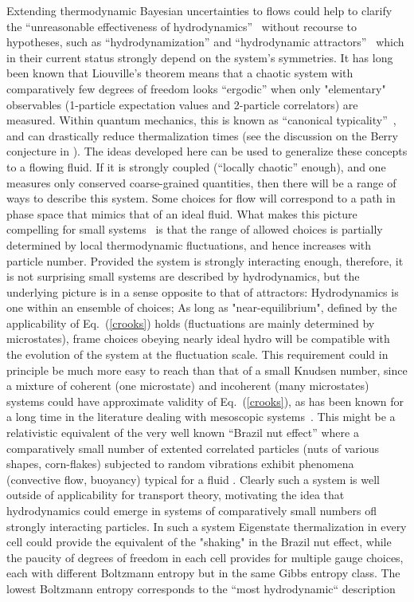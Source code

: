 \documentclass[12pt,onecolumn,showpacs,amssymb,aps,nofootinbib,floatfix]{revtex4-2}
\renewcommand{\eqref}[1]{Eq.~(\ref{#1})}
\begin{document}
	Extending thermodynamic Bayesian uncertainties to flows could help to clarify the ``unreasonable effectiveness of hydrodynamics''~\cite{unreasonable} without recourse to hypotheses, such as ``hydrodynamization'' and ``hydrodynamic attractors''~\cite{attractors} which in their current status strongly depend on the system's symmetries.
	It has long been known that Liouville's theorem means that a chaotic system with comparatively few degrees of freedom looks ``ergodic'' when only "elementary" observables (1-particle expectation values and 2-particle correlators) are measured.  Within quantum mechanics, this is known as ``canonical typicality''~\cite{typicality,typicality1}, and can drastically reduce thermalization times (see the discussion on the Berry conjecture in \cite{berry}).
	The ideas developed here can be used to generalize these concepts to a flowing fluid. If it is strongly coupled (``locally chaotic'' enough), and one measures only conserved coarse-grained quantities, then there will be a range of ways to describe this system.  Some choices for flow will correspond to a path in phase space that mimics that of an ideal fluid.   What makes this picture compelling for small systems~\cite{zajc} is that the range of allowed choices is partially determined by local thermodynamic fluctuations, and hence increases with particle number.   Provided the system is strongly interacting enough, therefore, it is not surprising small systems are described by hydrodynamics, but the underlying picture is in a sense opposite to that of attractors: Hydrodynamics is one within an ensemble of choices;  As long as "near-equilibrium", defined by the applicability of \eqref{crooks} holds (fluctuations are mainly determined by microstates), frame choices obeying nearly ideal hydro will be compatible
with the evolution of the system at the fluctuation scale. \color{black}  This requirement could in principle be much more easy to reach than that of a small Knudsen number, since a mixture of coherent (one microstate) and incoherent (many microstates) systems could have approximate validity of \eqref{crooks}, as has been known for a long time in the literature dealing with mesoscopic systems~\cite{landi}.   This might be a relativistic equivalent of the very well known ``Brazil nut effect'' where a comparatively small number of extented correlated particles (nuts of various shapes, corn-flakes) subjected to random vibrations exhibit phenomena (convective flow, buoyancy) typical for a fluid \cite{brazilnut}.   Clearly such a system is well outside of applicability for transport theory, motivating the idea that hydrodynamics could emerge in systems of comparatively small numbers ofl strongly interacting particles.   In such a system Eigenstate thermalization \cite{typicality1} in every cell could provide the equivalent of the "shaking" in the Brazil nut effect, while the paucity of degrees of freedom in each cell provides for multiple gauge choices, each with different Boltzmann entropy but in the same Gibbs entropy class.   The lowest Boltzmann entropy corresponds to the ``most hydrodynamic`` description\color{black}
	
\end{document}
